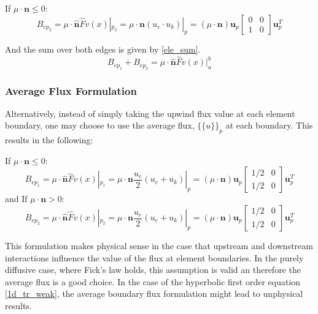 If $\mu \cdot \mathbf n \leq 0$:
\begin{equation}
B_{ep_2} = \mu \cdot \hat{\mathbf n} \hat{F}  v(x)|_{p_2} = 
\mu \cdot \mathbf n (u_e \cdot u_k)|_p = 
(\mu \cdot \mathbf n) \mathbf u_p 
\begin{bmatrix}
    0      & 0 \\
    1      & 0 
\end{bmatrix}
\mathbf u_p^T
\end{equation}

And the sum over both edges is given by \ref{ele_sum}.
\begin{equation}
 B_{ep_1} + B_{ep_2} = \mu \cdot \hat{\mathbf n} \hat{F}  v(x)|_a^b
\label{ele_sum}
\end{equation}

\subsubsection{Average Flux Formulation}
Alternatively, instead of simply taking the upwind flux value at each element boundary, one may choose to use the average flux, $\{\{u\}\}_p$ at each boundary.  This results in the following:

If $\mu \cdot \mathbf n \leq 0$: 
\begin{equation}
B_{ep_1} = \mu \cdot \hat{\mathbf n} \hat{F}  v(x)|_{p_1} = 
\mu \cdot \mathbf n \frac{u_e}{2} (u_e + u_k)|_p = 
(\mu \cdot \mathbf n) \mathbf u_p 
\begin{bmatrix}
    1/2     & 0 \\
    1/2     & 0 
\end{bmatrix}
\mathbf u_p^T
\end{equation}
and
If $\mu \cdot \mathbf n > 0$:
\begin{equation}
B_{ep_2} = \mu \cdot \hat{\mathbf n} \hat{F}  v(x)|_{p_2} = 
\mu \cdot \mathbf n  \frac{u_e}{2} (u_e + u_k)|_p = 
(\mu \cdot \mathbf n) \mathbf u_p 
\begin{bmatrix}
    1/2     & 0 \\
    1/2     & 0 
\end{bmatrix}
\mathbf u_p^T
\end{equation}

This formulation makes physical sense in the case that upstream and downstream interactions influence the value of the flux at element boundaries.  In the purely diffusive case, where Fick's law holds, this assumption is valid an therefore the average flux is a good choice.  In the case of the hyperbolic first order equation \ref{1d_tr_weak}, the average boundary flux formulation might lead to unphysical results.

